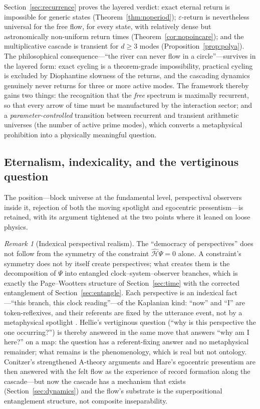 \documentclass[11pt,a4paper]{article}
\theoremstyle{plain}
\theoremstyle{definition}
\theoremstyle{remark}
\newtheorem{remark}[theorem]{Remark}
\newcommand{\Hmax}{\widehat{\mathcal{H}}}
\begin{document}
Section~\ref{sec:recurrence} proves the layered verdict: exact eternal return is
impossible for generic states (Theorem~\ref{thm:noperiod}); $\varepsilon$-return is
nevertheless universal for the free flow, for every state, with relatively dense but
astronomically non-uniform return times (Theorem~\ref{cor:nopoincare}); and the
multiplicative cascade is transient for $d\geq3$ modes (Proposition~\ref{prop:polya}). The
philosophical consequence---``the river can never flow in a
circle''---survives in the layered form: exact cycling is a theorem-grade impossibility,
practical cycling is excluded by Diophantine slowness of the returns, and the cascading
dynamics genuinely never returns for three or more active modes. The framework thereby gains
two things: the recognition that the \emph{free} spectrum is maximally
recurrent, so that every arrow of time must be manufactured by the interaction sector; and a
\emph{parameter-controlled} transition between recurrent and transient arithmetic universes
(the number of active prime modes), which converts a metaphysical prohibition into a
physically meaningful question.

\subsection{Eternalism, indexicality, and the vertiginous question}

The position---block universe at the fundamental level, perspectival observers
inside it, rejection of both the moving spotlight and egocentric presentism---is retained,
with its argument tightened at the two points where it leaned on loose physics.

\begin{remark}[Indexical perspectival realism]
The ``democracy of perspectives'' does not follow from the symmetry of
the constraint $\Hmax\Psi=0$ alone. A constraint's symmetry does not by itself create
perspectives; what creates them is the decomposition of $\Psi$ into entangled
clock--system--observer branches, which is exactly the Page--Wootters structure of
Section~\ref{sec:time} with the corrected entanglement of Section~\ref{sec:entangle}.
Each perspective is an indexical fact---``this branch, this clock reading''---of the
Kaplanian kind: ``now'' and ``I'' are token-reflexives, and their referents are fixed by
the utterance event, not by a metaphysical spotlight \cite{kaplan1989}. Hellie's vertiginous
question (``why is this perspective the one occurring?'') \cite{hellie2013} is thereby
answered in the same move that answers ``why am I here?'' on a map: the question has a
referent-fixing answer and no metaphysical remainder; what remains is the phenomenology,
which is real but not ontology. Conitzer's strengthened A-theory arguments
\cite{conitzer2019} and Hare's egocentric presentism \cite{hare2009} are then answered
with the felt flow as the experience of record formation
along the cascade---but now the cascade has a mechanism that exists
(Section~\ref{sec:dynamics}) and the flow's substrate is the superpositional entanglement
structure, not composite inseparability.
\end{remark}
\end{document}
